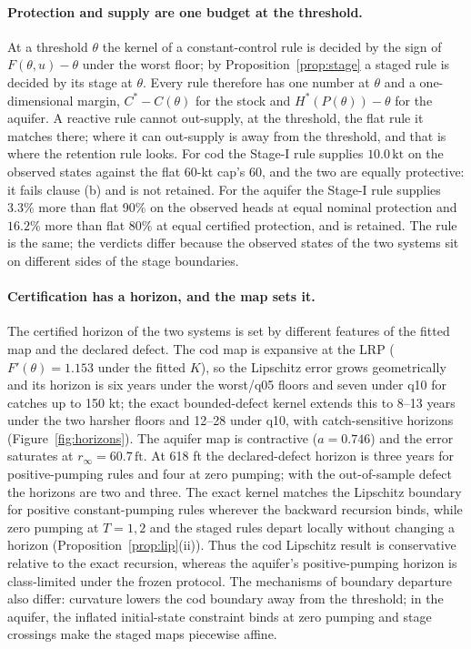 \documentclass[11pt,a4paper]{article}
\theoremstyle{plain}
\theoremstyle{definition}
\theoremstyle{remark}
\newcommand{\Cstar}{C^{*}}
\newcommand{\Hstar}{H^{*}}
\newcommand{\kt}{\,\mathrm{kt}}
\newcommand{\ft}{\,\mathrm{ft}}
\begin{document}
\paragraph{Protection and supply are one budget at the threshold.}
At a threshold $\theta$ the kernel of a constant-control rule is decided by the sign of $F(\theta,u)-\theta$ under the worst floor; by Proposition~\ref{prop:stage} a staged rule is decided by its stage at $\theta$. Every rule therefore has one number at $\theta$ and a one-dimensional margin, $\Cstar-C(\theta)$ for the stock and $\Hstar(P(\theta))-\theta$ for the aquifer. A reactive rule cannot out-supply, at the threshold, the flat rule it matches there; where it can out-supply is away from the threshold, and that is where the retention rule looks. For cod the Stage-I rule supplies $10.0\kt$ on the observed states against the flat 60-kt cap's 60, and the two are equally protective: it fails clause (b) and is not retained. For the aquifer the Stage-I rule supplies $3.3\%$ more than flat 90\% on the observed heads at equal nominal protection and $16.2\%$ more than flat 80\% at equal certified protection, and is retained. The rule is the same; the verdicts differ because the observed states of the two systems sit on different sides of the stage boundaries.

\paragraph{Certification has a horizon, and the map sets it.}
The certified horizon of the two systems is set by different features of the fitted map and the declared defect. The cod map is expansive at the LRP ($F'(\theta)=1.153$ under the fitted $K$), so the Lipschitz error grows geometrically and its horizon is six years under the worst/q05 floors and seven under q10 for catches up to 150 kt; the exact bounded-defect kernel extends this to 8--13 years under the two harsher floors and 12--28 under q10, with catch-sensitive horizons (Figure~\ref{fig:horizons}). The aquifer map is contractive ($a=0.746$) and the error saturates at $r_\infty=60.7\ft$. At 618 ft the declared-defect horizon is three years for positive-pumping rules and four at zero pumping; with the out-of-sample defect the horizons are two and three. The exact kernel matches the Lipschitz boundary for positive constant-pumping rules wherever the backward recursion binds, while zero pumping at $T=1,2$ and the staged rules depart locally without changing a horizon (Proposition~\ref{prop:lip}(ii)). Thus the cod Lipschitz result is conservative relative to the exact recursion, whereas the aquifer's positive-pumping horizon is class-limited under the frozen protocol. The mechanisms of boundary departure also differ: curvature lowers the cod boundary away from the threshold; in the aquifer, the inflated initial-state constraint binds at zero pumping and stage crossings make the staged maps piecewise affine.
\end{document}
